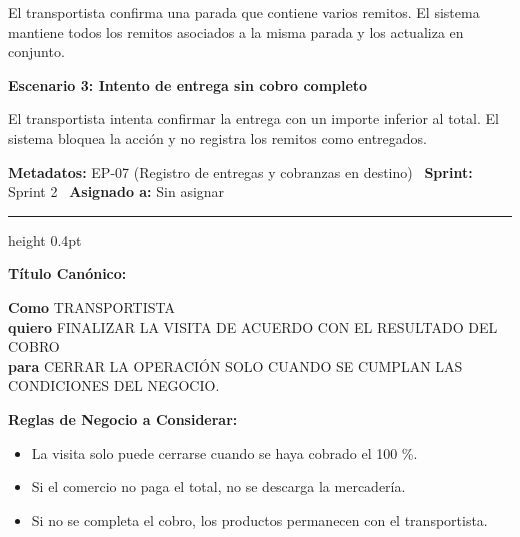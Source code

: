 \documentclass[a4paper,9pt]{article}
\begin{document}
\begin{tcolorbox}[hucard, title={\textbf{HU-30: REGISTRAR ENTREGA DE REMITOS} \hfill \scriptsize \colorbox{bluestatus}{\textbf{\ New\ }} \quad \colorbox{white}{\textcolor{primarydark}{\textbf{\ 3 pts\ }}}}]
{El transportista confirma una parada que contiene varios remitos. El sistema mantiene todos los remitos asociados a la misma parada y los actualiza en conjunto.\par\vspace{2.5pt}
\noindent\textbf{\textcolor{secondarydark}{Escenario 3:  Intento de entrega sin cobro completo}}\par\vspace{1pt}
El transportista intenta confirmar la entrega con un importe inferior al total. El sistema bloquea la acción y no registra los remitos como entregados.\par\vspace{2.5pt}
}\par
\end{tcolorbox}

\begin{tcolorbox}[hucard, title={\textbf{HU-33: FINALIZAR VISITA SEGÚN RESULTADO DE COBRANZA} \hfill \scriptsize \colorbox{bluestatus}{\textbf{\ New\ }} \quad \colorbox{white}{\textcolor{primarydark}{\textbf{\ 3 pts\ }}}}]
\vspace{-1pt}
\noindent\textbf{\footnotesize Metadatos:} EP-07 (Registro de entregas y cobranzas en destino) \textbar\ \textbf{Sprint:} Sprint 2 \textbar\ \textbf{Asignado a:} Sin asignar\par\vspace{2pt}
\hrule height 0.4pt\par\vspace{3pt}
\noindent\textbf{\footnotesize Título Canónico:}\par\vspace{1pt}
{\small \textbf{Como} TRANSPORTISTA \\ \textbf{quiero} FINALIZAR LA VISITA DE ACUERDO CON EL RESULTADO DEL COBRO \\ \textbf{para} CERRAR LA OPERACIÓN SOLO CUANDO SE CUMPLAN LAS CONDICIONES DEL NEGOCIO.}\par\vspace{3pt}
\noindent\textbf{\footnotesize Reglas de Negocio a Considerar:}\par\vspace{1pt}
{\footnotesize
\begin{itemize}[leftmargin=12pt, nosep, itemsep=1.5pt, topsep=1pt]
\item La visita solo puede cerrarse cuando se haya cobrado el 100 \%.
\item Si el comercio no paga el total, no se descarga la mercadería.
\item Si no se completa el cobro, los productos permanecen con el transportista.

\end{itemize}}
\end{tcolorbox}
\end{document}
